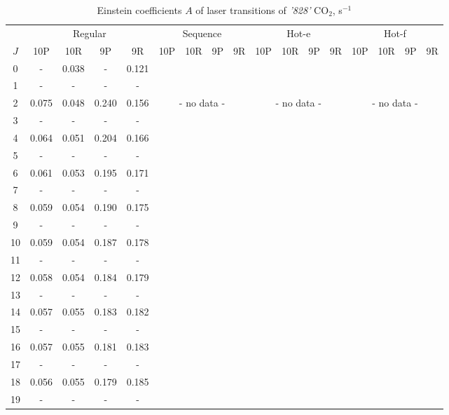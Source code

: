 \documentclass{report}
\begin{document}
\begin{table}
\centering
\caption{Einstein coefficients $A$ of laser transitions of \textit{'828'} CO$_2$, s$^{-1}$}
\label{table:A828}
\scriptsize
\begin{tabular}{|c|cccc|cccc|cccc|cccc|}
\hline
& \multicolumn{4}{c|}{Regular}& \multicolumn{4}{c|}{Sequence}& \multicolumn{4}{c|}{Hot-e}& \multicolumn{4}{c|}{Hot-f}\\
$J$ & 10P & 10R & 9P & 9R & 10P & 10R & 9P & 9R & 10P & 10R & 9P & 9R & 10P & 10R & 9P & 9R\\ 
\hline
0  &   -   & 0.038 &   -   & 0.121 & & & & & & & & & & & &\\
1  &   -   &   -   &   -   &   -   & & & & & & & & & & & &\\
2  & 0.075 & 0.048 & 0.240 & 0.156 & \multicolumn{4}{c|}{- no data -}& \multicolumn{4}{c|}{- no data -}& \multicolumn{4}{c|}{- no data -}\\
3  &   -   &   -   &   -   &   -   & & & & & & & & & & & &\\
4  & 0.064 & 0.051 & 0.204 & 0.166 & & & & & & & & & & & &\\
5  &   -   &   -   &   -   &   -   & & & & & & & & & & & &\\
6  & 0.061 & 0.053 & 0.195 & 0.171 & & & & & & & & & & & &\\
7  &   -   &   -   &   -   &   -   & & & & & & & & & & & &\\
8  & 0.059 & 0.054 & 0.190 & 0.175 & & & & & & & & & & & &\\
9  &   -   &   -   &   -   &   -   & & & & & & & & & & & &\\
10 & 0.059 & 0.054 & 0.187 & 0.178 & & & & & & & & & & & &\\
11 &   -   &   -   &   -   &   -   & & & & & & & & & & & &\\
12 & 0.058 & 0.054 & 0.184 & 0.179 & & & & & & & & & & & &\\
13 &   -   &   -   &   -   &   -   & & & & & & & & & & & &\\
14 & 0.057 & 0.055 & 0.183 & 0.182 & & & & & & & & & & & &\\
15 &   -   &   -   &   -   &   -   & & & & & & & & & & & &\\
16 & 0.057 & 0.055 & 0.181 & 0.183 & & & & & & & & & & & &\\
17 &   -   &   -   &   -   &   -   & & & & & & & & & & & &\\
18 & 0.056 & 0.055 & 0.179 & 0.185 & & & & & & & & & & & &\\
19 &   -   &   -   &   -   &   -   & & & & & & & & & & & &\\

\end{tabular}
\end{table}
\end{document}

